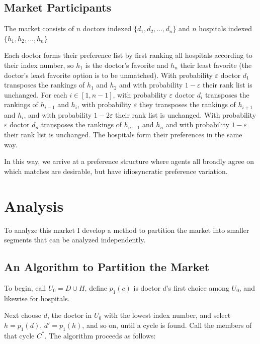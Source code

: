 \documentclass[WP]{AEA}
\begin{document}
\subsection{Market Participants}

The market consists of $n$ doctors  indexed $\{ d_1, d_2, ... ,d_n\}$ and  $n$ hospitals  indexed $\{ h_1, h_2, ... ,h_n\}$
	
Each doctor forms their preference list by first ranking all hospitals according to their index number, so $h_1$ is the doctor's favorite and $h_n$ their least favorite (the doctor's least favorite option is to be unmatched).  
With probability $\varepsilon$ doctor $d_1$ transposes the rankings of $h_{1}$ and $h_2$ and with probability $1-\varepsilon$ their rank list is unchanged.  For each $i  \in [1, n-1]$, with probability $\varepsilon$ doctor $d_i$ transposes the rankings of $h_{i-1}$ and $h_i$, with probability $\varepsilon$ they transposes the rankings of $h_{i+1}$ and $h_i$, and with probability $1-2\varepsilon$ their rank list is unchanged. With probability $\varepsilon$ doctor $d_n$ transposes the rankings of $h_{n-1}$ and $h_n$ and with probability $1-\varepsilon$ their rank list is unchanged.
The hospitals form their preferences in the same way.

In this way, we arrive at a preference structure where agents all broadly agree on which matches are desirable, but have idiosyncratic preference variation.
	


	
\section{Analysis}

To analyze this market I develop a method to partition the market into smaller segments that can be analyzed independently.


\subsection{An Algorithm to Partition the Market} \label{subsect:partition}

To begin, call $U_0 = D \cup H$, define $p_1(c)$ is doctor $d$'s first choice among $U_0$, and likewise for hospitals.

Next choose $d$, the doctor in $U_0$ with the lowest index number, and select $h = p_1(d)$, $d' = p_1(h)$, and so on, until a cycle is found. Call the members of that cycle $C^*$.  The algorithm proceeds as follows: 
\end{document}
